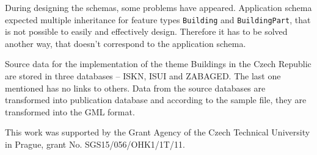 \documentclass[eprint]{actapoly}
\begin{document}
During designing the schemas, some problems have appeared. Application schema expected multiple inheritance for feature types \texttt{Building} and \texttt{BuildingPart}, that is not possible to easily and effectively design. Therefore it has to be solved another way, that doesn't correspond to the application schema. 

Source data for the implementation of the theme Buildings in the Czech Republic are stored in three databases -- ISKN, ISUI and ZABAGED\circledR. The last one mentioned has no links to others. Data from the source databases are transformed into publication database and according to the sample file, they are transformed into the GML format.


\begin{acknowledgements}
This work was supported by the Grant Agency of the Czech Technical University in Prague, grant No. SGS15/056/OHK1/1T/11.\end{acknowledgements}





\nocite{Med13:Geoinformatics11} %
\nocite{Tryhubova13:geoinformatics1}
\nocite{Polacek:geoinformatics8}
\end{document}

